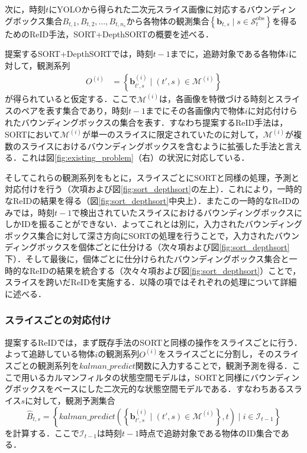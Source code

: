     次に，時刻$t$にYOLOから得られた二次元スライス画像に対応するバウンディングボックス集合$B_{t, 1}, B_{t, 2}, \dots, B_{t, n_s}$から各物体の観測集合$\left\{\bm{b}_{t, s} \mid s \in \mathcal{S}_t^{\text{obs}}\right\}$を得るためのReID手法，SORT+DepthSORTの概要を述べる．

    提案するSORT+DepthSORTでは，時刻$t-1$までに，追跡対象である各物体$i$に対して，観測系列
    \begin{equation}
        \label{eq:tracks_on_reid}
        \begin{aligned}
            O^{(i)} &= \left\{\bm{b}_{t',s}^{(i)} \mid (t', s) \in \mathcal{M}^{(i)}\right\}
        \end{aligned}
    \end{equation}
    が得られていると仮定する．ここで$\mathcal{M}^{(i)}$は，各画像を特徴づける時刻とスライスのペアを表す集合であり，時刻$t-1$までにその各画像内で物体$i$に対応付けられたバウンディングボックスの集合を表す．すなわち提案するReID手法は，SORTにおいて$\mathcal{M}^{(i)}$が単一のスライスに限定されていたのに対して，$\mathcal{M}^{(i)}$が複数のスライスにおけるバウンディングボックスを含むように拡張した手法と言える．これは図\ref{fig:existing_problem}（右）の状況に対応している．

    そしてこれらの観測系列をもとに，スライスごとにSORTと同様の処理，予測と対応付けを行う（次項および図\ref{fig:sort_depthsort}の左上）．これにより，一時的なReIDの結果を得る（図\ref{fig:sort_depthsort}中央上）．またこの一時的なReIDのみでは，時刻$t-1$で検出されていたスライスにおけるバウンディングボックスにしかIDを振ることができない．よってこれとは別に，入力されたバウンディングボックス集合に対して深さ方向にSORTの処理を行うことで，入力されたバウンディングボックスを個体ごとに仕分ける（次々項および図\ref{fig:sort_depthsort}下）．そして最後に，個体ごとに仕分けられたバウンディングボックス集合と一時的なReIDの結果を統合する（次々々項および図\ref{fig:sort_depthsort}）ことで，スライスを跨いだReIDを実施する．以降の項ではそれぞれの処理について詳細に述べる．

        \subsubsection{スライスごとの対応付け}

        提案するReIDでは，まず既存手法のSORTと同様の操作をスライスごとに行う．よって追跡している物体$i$の観測系列$O^{(i)}$をスライスごとに分割し，そのスライスごとの観測系列を$kalman\_predict$関数に入力することで，観測予測を得る．ここで用いるカルマンフィルタの状態空間モデルは，SORTと同様にバウンディングボックスをベースにした二次元的な状態空間モデルである．すなわちあるスライス$s$に対して，観測予測集合
        \begin{equation}
            \label{eq:slice_wise_prediction}
            \hat{B}_{t, s} = \left\{kalman\_predict\left(\left\{\bm{b}_{t', s}^{(i)} \mid (t', s) \in \mathcal{M}^{(i)}\right\}, t\right) \mid i \in \mathcal{I}_{t-1}\right\}
        \end{equation}
        を計算する．ここで$\mathcal{I}_{t-1}$は時刻$t-1$時点で追跡対象である物体のID集合である．
        
